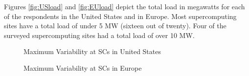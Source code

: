 Figures \ref{fig:USload} and \ref{fig:EUload} depict the total load in megawatts for each of the respondents in the United States and in Europe. Most supercomputing sites have a total load of under 5 MW (sixteen out of twenty). Four of the surveyed supercomputing sites had a total load of over 10 MW. 

\begin{figure}[ht!]
\begin{center}
\caption{Maximum Variability at SCs in United States}
\label{fig:USvar}
\vspace{0.9cm}
\caption{Maximum Variability at SCs in Europe}
\label{fig:EUvar}
\end{center}
\end{figure}

